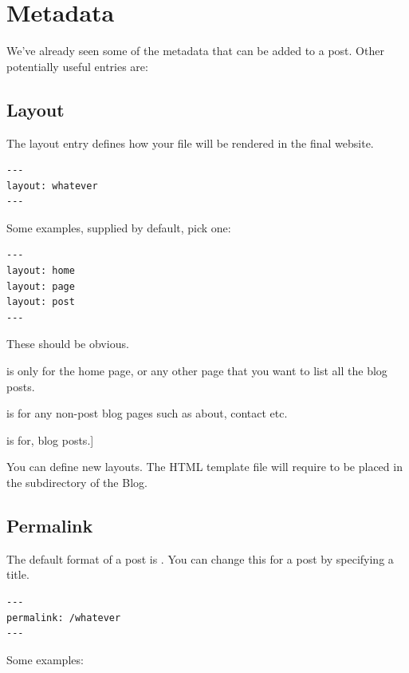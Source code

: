 \section{Metadata}\label{sect: Metadata}

We've already seen some of the metadata that can be added to a post. Other potentially useful entries are:

\subsection{Layout}

The layout entry defines how your file will be rendered in the final website.

\begin{lstlisting}[style=myText]
---
layout: whatever
---
\end{lstlisting}

Some examples, supplied by default, pick one:

\begin{lstlisting}[style=myText]
---
layout: home
layout: page
layout: post
---
\end{lstlisting}

These should be obvious.

\begin{description}[Home]
    \item[Home] is only for the home page, or any other page that you want to list all the blog posts.
    \item[Page] is for any non-post blog pages such as about, contact etc.
    \item[Post] is for, blog posts.]
\end{description}

You can define new layouts. The HTML template file will require to be placed in the  subdirectory of the Blog.

\subsection{Permalink}

The default format of a post is . You can change this for a post by specifying a title. %

\begin{lstlisting}[style=myText]
---
permalink: /whatever
---
\end{lstlisting}

Some examples:

